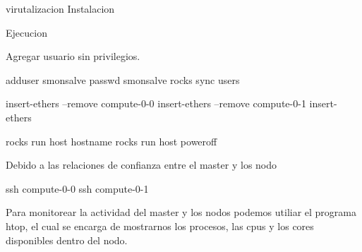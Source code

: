 virutalizacion
Instalacion

Ejecucion


Agregar usuario sin privilegios. 

adduser smonsalve
passwd smonsalve
rocks sync users


insert-ethers --remove compute-0-0
insert-ethers --remove compute-0-1
insert-ethers 

rocks run host hostname
rocks run host poweroff



Debido a las relaciones de confianza entre el master y los nodo


ssh compute-0-0
ssh compute-0-1


Para monitorear la actividad del master y los nodos podemos utiliar el programa htop, el cual se encarga de mostrarnos los procesos, las cpus y los cores disponibles dentro del nodo. 

